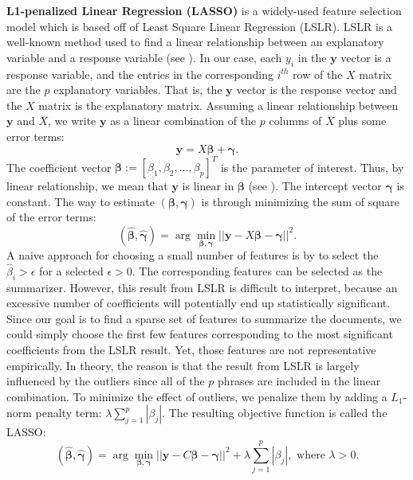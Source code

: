 \documentclass{article}
\begin{document}
\textbf{L1-penalized Linear Regression (LASSO)} is a widely-used feature selection model which is based off of Least Square Linear Regression (LSLR). LSLR is a well-known method used to find a linear relationship between an explanatory variable and a response variable (see \cite{applied}). In our case, each $y_i$ in the $\textbf{y}$ vector is a response variable, and the entries in the corresponding $i^{th}$ row of the $X$ matrix are the $p$ explanatory variables. That is, the $\textbf{y}$ vector is the response vector and the $X$ matrix is the explanatory matrix. Assuming a linear relationship between $\textbf{y}$ and $X$, we write $\textbf{y}$ as a linear combination of the $p$ columns of $X$ plus some error terms:
$$\boldsymbol{y}=X\boldsymbol{\beta}+\boldsymbol{\gamma}.$$
 The coefficient vector $\boldsymbol{\beta}:=[\beta_1, \beta_2, \ldots, \beta_p]^T$ is the parameter of interest. Thus, by linear relationship, we mean that $\textbf{y}$ is linear in $\boldsymbol{\beta}$ (see \cite{element}). The intercept vector $\boldsymbol{\gamma}$ is constant. The way to estimate $(\boldsymbol{\beta}, \boldsymbol{\gamma})$ is through minimizing the sum of square of the error terms:
$$(\hat{\boldsymbol{\beta}}, \hat{\boldsymbol{\gamma}})=\arg \min_{\boldsymbol{\beta},\boldsymbol{\gamma}} ||\boldsymbol{y}-X\boldsymbol{\beta}-\boldsymbol{\gamma}||^2.$$
A naive approach for choosing a small number of features is by to select the $\hat{\beta}_i>\epsilon$ for a selected $\epsilon >0 $. The corresponding features can be selected as the summarizer. However, this result from LSLR is difficult to interpret, because an excessive number of coefficients will potentially end up statistically significant. Since our goal is to find a sparse set of features to summarize the documents, we could simply choose the first few features corresponding to the most significant coefficients from the LSLR result. Yet, those features are not representative empirically. In theory, the reason is that the result from LSLR is largely influenced by the outliers since all of the $p$ phrases are included in the linear combination. To minimize the effect of outliers, we penalize them by adding a $L_1$-norm penalty term: $\lambda\sum^p_{j=1}|\beta_j|$. The resulting objective function is called the LASSO:
\begin{equation}\label{a}
(\hat{\boldsymbol{\beta}}, \hat{\boldsymbol{\gamma}})=\arg \min_{\boldsymbol{\beta},\boldsymbol{\gamma}} ||\boldsymbol{y}-C\boldsymbol{\beta}-\boldsymbol{\gamma}||^2+\lambda\sum^p_{j=1}|\beta_j|,\text{ where }\lambda>0.
\end{equation}
\end{document}
